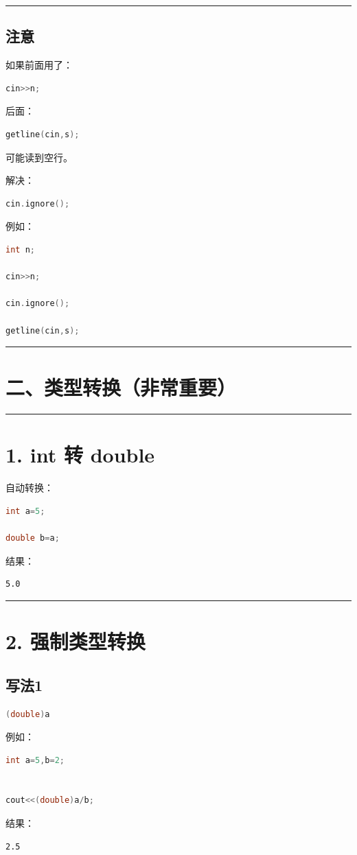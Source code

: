 \documentclass[9pt,twocolumn]{extarticle}
\begin{document}
\noindent\rule{\linewidth}{0.4pt}

\subsection{注意}
如果前面用了：
\begin{lstlisting}[language=C++]
cin>>n;
\end{lstlisting}
后面：
\begin{lstlisting}[language=C++]
getline(cin,s);
\end{lstlisting}
可能读到空行。

解决：
\begin{lstlisting}[language=C++]
cin.ignore();
\end{lstlisting}
例如：
\begin{lstlisting}[language=C++]
int n;

cin>>n;

cin.ignore();

getline(cin,s);
\end{lstlisting}

\noindent\rule{\linewidth}{0.4pt}

\section{二、类型转换（非常重要）}

\noindent\rule{\linewidth}{0.4pt}

\section{1. int 转 double}

自动转换：
\begin{lstlisting}[language=C++]
int a=5;

double b=a;
\end{lstlisting}
结果：
\begin{lstlisting}
5.0
\end{lstlisting}

\noindent\rule{\linewidth}{0.4pt}

\section{2. 强制类型转换}

\subsection{写法1}
\begin{lstlisting}[language=C++]
(double)a
\end{lstlisting}
例如：
\begin{lstlisting}[language=C++]
int a=5,b=2;


cout<<(double)a/b;
\end{lstlisting}
结果：
\begin{lstlisting}
2.5
\end{lstlisting}
\end{document}
